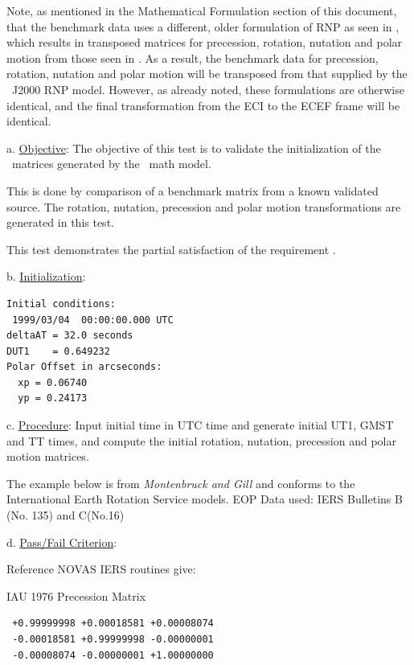 Note, as mentioned in the Mathematical Formulation section of this
document, that the benchmark data uses a different, older formulation of RNP
as seen in \cite{Bond1}, which results in transposed matrices for precession,
rotation, nutation and polar motion from those seen in \cite{ValladoThird}.
As a result, the benchmark data for precession, rotation, nutation and polar
motion will be transposed from that supplied by the \JEODid\ J2000 RNP model.
However, as already noted, these formulations are otherwise identical,
and the final transformation from the ECI to the ECEF frame will be
identical.

\label{test:rnp_test1}

a. \underline{Objective}:\newline
The objective of this test is to validate the initialization 
of the \ModelDesc\ matrices generated by the \ModelDesc\ math model.

This is done by comparison of a benchmark matrix from a known 
validated source.  The rotation, nutation, precession and polar 
motion transformations are generated in this test.\newline

This test demonstrates the partial satisfaction
of the requirement .

b. \underline{Initialization}:
\begin{verbatim}
Initial conditions:
 1999/03/04  00:00:00.000 UTC
deltaAT = 32.0 seconds
DUT1    = 0.649232
Polar Offset in arcseconds:
  xp = 0.06740
  yp = 0.24173
\end{verbatim}

c. \underline{Procedure}:\newline
Input initial time in UTC time and generate initial 
UT1, GMST and TT times, and compute the 
initial rotation, nutation, precession and polar motion matrices. 

The example below is from {\em Montenbruck and Gill} \cite{MG}
and conforms to the International Earth Rotation Service models.  
EOP Data used: IERS Bulletins B (No. 135) and C(No.16)\newline

d. \underline{Pass/Fail Criterion}:\newline

Reference NOVAS \cite{NOVAS} IERS routines give:

IAU 1976 Precession Matrix
\begin{verbatim}
 +0.99999998 +0.00018581 +0.00008074
 -0.00018581 +0.99999998 -0.00000001
 -0.00008074 -0.00000001 +1.00000000
\end{verbatim}

